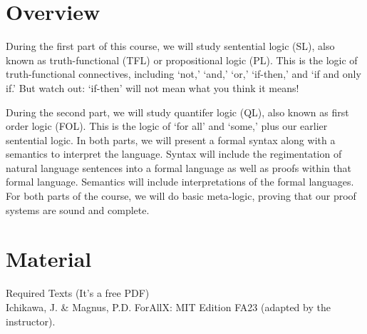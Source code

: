 \documentclass[letterpaper]{inzane_syllabus} %
\begin{document}

\makeprofile %

\section{Overview}

During the first part of this course, we will study sentential logic (SL), also known as truth-functional (TFL) or propositional logic (PL). 
This is the logic of truth-functional connectives, including ‘not,’ ‘and,’ ‘or,’ ‘if-then,’ and ‘if and only if.’ 
But watch out: ‘if-then’ will not mean what you think it means! 

During the second part, we will study quantifer logic (QL), also known as first order logic (FOL). 
This is the logic of ‘for all’ and ‘some,’ plus our earlier sentential logic. 
In both parts, we will present a formal syntax along with a semantics to interpret the language.
Syntax will include the regimentation of natural language sentences into a formal language as well as proofs within that formal language. 
Semantics will include interpretations of the formal languages. 
For both parts of the course, we will do basic meta-logic, proving that our proof systems are sound and complete.

\vspace{0.5cm} %
\section{Material}

{\color{myCOLOR} Required Texts (It’s a free PDF)}\\
Ichikawa, J. \& Magnus, P.D. ForAllX: MIT Edition FA23 (adapted by the instructor). \\
\end{document}
